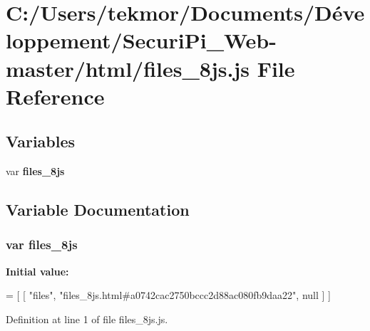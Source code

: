 \section{C\+:/\+Users/tekmor/\+Documents/\+Développement/\+Securi\+Pi\+\_\+\+Web-\/master/html/files\+\_\+8js.js File Reference}
\label{files__8js_8js}
\subsection*{Variables}
\begin{DoxyCompactItemize}
\item 
var {\bf files\+\_\+8js}
\end{DoxyCompactItemize}


\subsection{Variable Documentation}
\subsubsection[{files\+\_\+8js}]{\setlength{\rightskip}{0pt plus 5cm}var files\+\_\+8js}\label{files__8js_8js_a38573b83c93331f9b3a2e8d38f38457a}
{\bfseries Initial value\+:}
\begin{DoxyCode}
=
[
    [ \textcolor{stringliteral}{"files"}, \textcolor{stringliteral}{"files\_8js.html#a0742cac2750bccc2d88ac080fb9daa22"}, null ]
]
\end{DoxyCode}


Definition at line 1 of file files\+\_\+8js.\+js.

